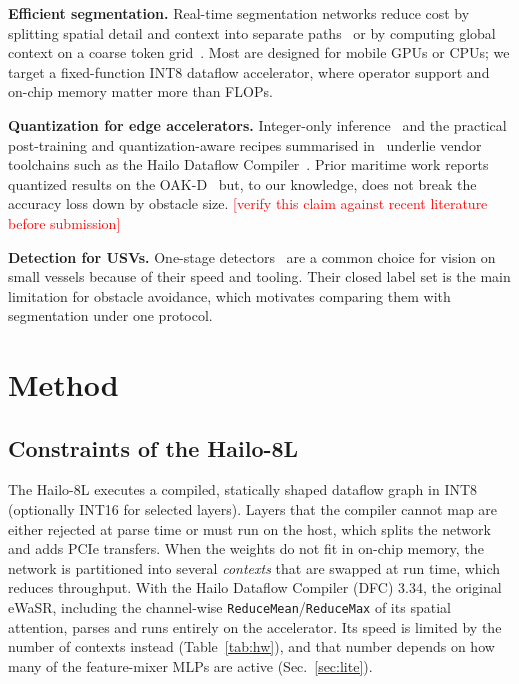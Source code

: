 \documentclass[conference]{IEEEtran}
\newcommand{\tbd}[1]{\textcolor{red}{[#1]}}
\begin{document}
\textbf{Efficient segmentation.} Real-time segmentation networks reduce cost by splitting spatial detail and context into separate paths~\cite{yu2018bisenet} or by computing global context on a coarse token grid~\cite{zhang2022topformer}. Most are designed for mobile GPUs or CPUs; we target a fixed-function INT8 dataflow accelerator, where operator support and on-chip memory matter more than FLOPs.

\textbf{Quantization for edge accelerators.} Integer-only inference~\cite{jacob2018quantization} and the practical post-training and quantization-aware recipes summarised in~\cite{krishnamoorthi2018quantizing,nagel2021white} underlie vendor toolchains such as the Hailo Dataflow Compiler~\cite{hailo_dfc}. Prior maritime work reports quantized results on the OAK-D~\cite{tersek2023ewasr} but, to our knowledge, does not break the accuracy loss down by obstacle size. \tbd{verify this claim against recent literature before submission}

\textbf{Detection for USVs.} One-stage detectors~\cite{redmon2016yolo,jocher2023yolov8} are a common choice for vision on small vessels because of their speed and tooling. Their closed label set is the main limitation for obstacle avoidance, which motivates comparing them with segmentation under one protocol.

\section{Method}
\label{sec:method}
\subsection{Constraints of the Hailo-8L}
The Hailo-8L executes a compiled, statically shaped dataflow graph in INT8 (optionally INT16 for selected layers). Layers that the compiler cannot map are either rejected at parse time or must run on the host, which splits the network and adds PCIe transfers. When the weights do not fit in on-chip memory, the network is partitioned into several \emph{contexts} that are swapped at run time, which reduces throughput. With the Hailo Dataflow Compiler (DFC) 3.34, the original eWaSR, including the channel-wise \texttt{ReduceMean}/\texttt{ReduceMax} of its spatial attention, parses and runs entirely on the accelerator. Its speed is limited by the number of contexts instead (Table~\ref{tab:hw}), and that number depends on how many of the feature-mixer MLPs are active (Sec.~\ref{sec:lite}).
\end{document}
